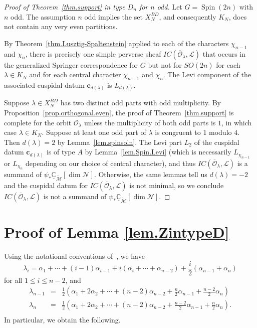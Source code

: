 \documentclass[reqno,11pt]{amsart}
\theoremstyle{remark}
\theoremstyle{remark}
\theoremstyle{definition}
\theoremstyle{definition}
\theoremstyle{definition}
\numberwithin{equation}{section}
\newcommand{\C}{\mathbb{C}}           %
\newcommand{\Spin}{\operatorname{Spin}}
\newcommand{\cl}{\mathcal{L}}
\newcommand{\cm}{\mathcal{M}}
\newcommand{\cn}{\mathcal{N}}
\newcommand{\co}{\mathcal{O}}
\newcommand{\shc}{\underline{\C}}
\renewcommand{\tilde}{\widetilde}
\begin{document}
\begin{proof}[Proof of Theorem~\ref{thm.support} in type $D_n$ for $n$ odd]  Let $G=\Spin(2n)$ with $n$ odd. The assumption $n$ odd implies the set $X_N^{BD}$, and consequently $K_N$, does not contain any very even partitions. 

By Theorem~\ref{thm.Lusztig-Spaltenstein} applied to each of the characters $\chi_{n-1}$ and $\chi_n$, there is precisely one simple perverse sheaf $IC(\overline{\co}_{\lambda}, \cl)$  that occurs in the generalized Springer correspondence for $G$ but not for $SO(2n)$ for each $\lambda \in K_N$ and for each central character $\chi_{n-1}$ and $\chi_n$. The Levi component of the associated cuspidal datum $\mathbf{c}_{d(\lambda)}$ is $L_{d(\lambda)}$.  

Suppose $\lambda\in X_N^{BD}$ has two distinct odd parts with odd multiplicity. By Proposition~\ref{prop.orthogonal.even}, the proof of Theorem~\ref{thm.support} is complete for the orbit $\co_\lambda$ unless the multiplicity of both odd parts is $1$, in which case $\lambda \in K_N$. Suppose at least one odd part of $\lambda$ is congruent to $1$ modulo $4$. Then $d(\lambda)=2$ by Lemma~\ref{lem.spinsoln}. The Levi part $L_2$ of the cuspidal datum $\mathbf{c}_{d(\lambda)}$ is of type $A$ by Lemma~\ref{lem.Spin.Levi} (which is necessarily $L_{\chi_{n-1}}$ or $L_{\chi_n}$ depending on our choice of central character), and thus $IC(\overline{\co}_{\lambda}, \cl)$ is a summand of $\psi_*\shc_{\tilde{\cm}}[\dim \cn]$. Otherwise, the same lemmas tell us $d(\lambda)=-2$ and the cuspidal datum for $IC(\overline{\co}_{\lambda}, \cl)$ is not minimal, so we conclude $IC(\overline{\co}_{\lambda}, \cl)$ is not a summand of $\psi_*\shc_{\tilde{\cm}}[\dim \cn]$.
\end{proof}



\appendix

\section{Proof of Lemma \ref{lem.ZintypeD}} \label{appendix.ZintypeD}
Using the notational conventions of~\cite{HumphreysLieAlg}, we have
\[
\lambda_i = \alpha_1 + \cdots + (i-1)\alpha_{i-1}+ i( \alpha_i+ \cdots + \alpha_{n-2}) + \frac{i}{2}(\alpha_{n-1}+\alpha_n)
\]
for all $1\leq i \leq n-2$, and
\begin{eqnarray*}
\lambda_{n-1} &=&  \frac{1}{2} \left( \alpha_1 + 2\alpha_2 + \cdots + (n-2)\alpha_{n-2} + \frac{n}{2}\alpha_{n-1}+\frac{n-2}{2}\alpha_n \right) \\
\lambda_{n} &=&   \frac{1}{2} \left( \alpha_1 + 2\alpha_2 + \cdots + (n-2)\alpha_{n-2} + \frac{n-2}{2}\alpha_{n-1}+\frac{n}{2}\alpha_n \right).   \\
\end{eqnarray*}
In particular, we obtain the following.
\end{document}
